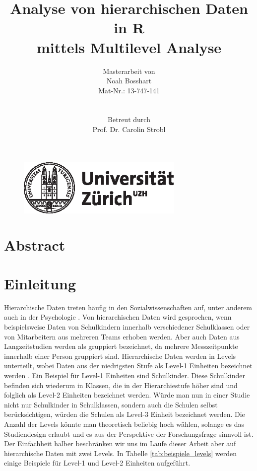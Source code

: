 \documentclass[12pt]{article}\usepackage[]{graphicx}\usepackage[]{color}
\title{Analyse von hierarchischen Daten in R \\ mittels Multilevel Analyse}
\author{Masterarbeit von \\ Noah Bosshart \\ Mat-Nr.: 13-747-141 \\ \\ \\ Betreut durch \\ Prof. Dr. Carolin Strobl}
\numberwithin{equation}{section}
\begin{document}
\begin{figure}[t]
  \centering
  \includegraphics[width = 8cm]{uzh_logo}
\end{figure}

\maketitle

\newpage
\tableofcontents

\newpage
\listoffigures

\newpage
\listoftables

\newpage
\section{Abstract}

\newpage

\section{Einleitung}
Hierarchische Daten treten häufig in den Sozialwissenschaften auf, unter anderem auch in der Psychologie \citep{SnijdersTomA.B2012Ma:a}. Von hierarchischen Daten wird gesprochen, wenn beispielsweise Daten von Schulkindern innerhalb verschiedener Schulklassen oder von Mitarbeitern aus mehreren Teams erhoben werden. Aber auch Daten aus Langzeitstudien werden als gruppiert bezeichnet, da mehrere Messzeitpunkte innerhalb einer Person gruppiert sind. Hierarchische Daten werden in Levels unterteilt, wobei Daten aus der niedrigsten Stufe als Level-1 Einheiten bezeichnet werden \citep{SnijdersTomA.B2012Ma:a}. Ein Beispiel für Level-1 Einheiten sind Schulkinder. Diese Schulkinder befinden sich wiederum in Klassen, die in der Hierarchiestufe höher sind und folglich als Level-2 Einheiten bezeichnet werden. Würde man nun in einer Studie nicht nur Schulkinder in Schulklassen, sondern auch  die Schulen selbst berücksichtigen, würden die Schulen als Level-3 Einheit bezeichnet werden. Die Anzahl der Levels könnte man theoretisch beliebig hoch wählen, solange es das Studiendesign erlaubt und es aus der Perspektive der Forschungsfrage sinnvoll ist. Der Einfachheit halber beschränken wir uns im Laufe dieser Arbeit aber auf hierarchische Daten mit zwei Levels. In Tabelle \ref{tab:beispiele_levels} werden einige Beispiele für Level-1 und Level-2 Einheiten aufgeführt. 
\end{document}
